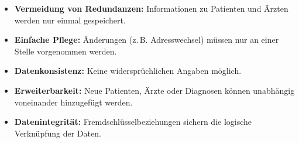 \documentclass[a4paper,12pt]{article}
\begin{document}
\begin{enumerate}
	\vspace{1em}
	
	\begin{itemize}
		\item \textbf{Vermeidung von Redundanzen:} Informationen zu Patienten und Ärzten werden nur einmal gespeichert.
		\item \textbf{Einfache Pflege:} Änderungen (z.\,B. Adresswechsel) müssen nur an einer Stelle vorgenommen werden.
		\item \textbf{Datenkonsistenz:} Keine widersprüchlichen Angaben möglich.
		\item \textbf{Erweiterbarkeit:} Neue Patienten, Ärzte oder Diagnosen können unabhängig voneinander hinzugefügt werden.
		\item \textbf{Datenintegrität:} Fremdschlüsselbeziehungen sichern die logische Verknüpfung der Daten.
	\end{itemize}
\end{enumerate}

	
	
	
	\vspace{2em}
	
	
	
\end{document}
